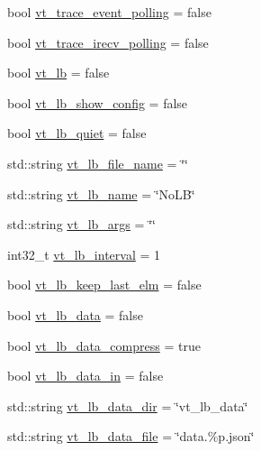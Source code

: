 \begin{DoxyCompactItemize}
\item 
bool \hyperlink{structvt_1_1arguments_1_1_app_config_a43da3e179ed4ad72411a41b46fae97e0}{vt\+\_\+trace\+\_\+event\+\_\+polling} = false
\item 
bool \hyperlink{structvt_1_1arguments_1_1_app_config_a7753691852b0b5475c953789173cf555}{vt\+\_\+trace\+\_\+irecv\+\_\+polling} = false
\item 
bool \hyperlink{structvt_1_1arguments_1_1_app_config_a7f1564af24349d7f524f7b509d92fd22}{vt\+\_\+lb} = false
\item 
bool \hyperlink{structvt_1_1arguments_1_1_app_config_ad761cc13b53725198b80057782e8e37b}{vt\+\_\+lb\+\_\+show\+\_\+config} = false
\item 
bool \hyperlink{structvt_1_1arguments_1_1_app_config_a7942c44d537f66f507209de26cbbb55d}{vt\+\_\+lb\+\_\+quiet} = false
\item 
std\+::string \hyperlink{structvt_1_1arguments_1_1_app_config_a53287cd1d5e9fbb62931b956b0770d93}{vt\+\_\+lb\+\_\+file\+\_\+name} = \char`\"{}\char`\"{}
\item 
std\+::string \hyperlink{structvt_1_1arguments_1_1_app_config_a1d8ed9d03eb82a15a81ad5e1ca6388b4}{vt\+\_\+lb\+\_\+name} = \char`\"{}No\+LB\char`\"{}
\item 
std\+::string \hyperlink{structvt_1_1arguments_1_1_app_config_ab2811622e1d9627bd2af4add74b7ffc9}{vt\+\_\+lb\+\_\+args} = \char`\"{}\char`\"{}
\item 
int32\+\_\+t \hyperlink{structvt_1_1arguments_1_1_app_config_a8d23afe2b4a2ac7d7354e3379f5b24ae}{vt\+\_\+lb\+\_\+interval} = 1
\item 
bool \hyperlink{structvt_1_1arguments_1_1_app_config_ab5dd6ec0c6828ff0ee8a539d63273e36}{vt\+\_\+lb\+\_\+keep\+\_\+last\+\_\+elm} = false
\item 
bool \hyperlink{structvt_1_1arguments_1_1_app_config_a1827a1321107d431d893a3d31b781580}{vt\+\_\+lb\+\_\+data} = false
\item 
bool \hyperlink{structvt_1_1arguments_1_1_app_config_a884062d3eff71606d4bab20b8c79b28a}{vt\+\_\+lb\+\_\+data\+\_\+compress} = true
\item 
bool \hyperlink{structvt_1_1arguments_1_1_app_config_a7a9a647adec3be9cf5b7ea5b7afa5819}{vt\+\_\+lb\+\_\+data\+\_\+in} = false
\item 
std\+::string \hyperlink{structvt_1_1arguments_1_1_app_config_ab1ca57ce4941e2a3e38e3e992bd15dc3}{vt\+\_\+lb\+\_\+data\+\_\+dir} = \char`\"{}vt\+\_\+lb\+\_\+data\char`\"{}
\item 
std\+::string \hyperlink{structvt_1_1arguments_1_1_app_config_a2e5c9eeb4b33b8fa6a5aa982a7b7b27a}{vt\+\_\+lb\+\_\+data\+\_\+file} = \char`\"{}data.\%p.\+json\char`\"{}

\end{DoxyCompactItemize}
